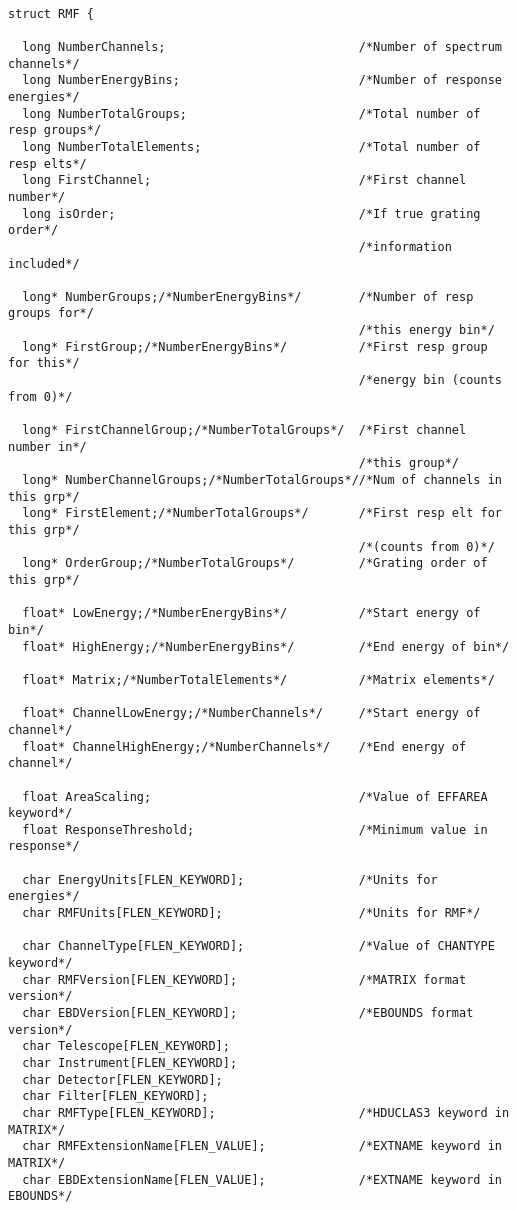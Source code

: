 \documentclass[11pt]{book}
\begin{document}
\begin{verbatim}

struct RMF {

  long NumberChannels;                           /*Number of spectrum channels*/
  long NumberEnergyBins;                         /*Number of response energies*/
  long NumberTotalGroups;                        /*Total number of resp groups*/
  long NumberTotalElements;                      /*Total number of resp elts*/
  long FirstChannel;                             /*First channel number*/
  long isOrder;                                  /*If true grating order*/
                                                 /*information included*/

  long* NumberGroups;/*NumberEnergyBins*/        /*Number of resp groups for*/
                                                 /*this energy bin*/
  long* FirstGroup;/*NumberEnergyBins*/          /*First resp group for this*/
                                                 /*energy bin (counts from 0)*/

  long* FirstChannelGroup;/*NumberTotalGroups*/  /*First channel number in*/
                                                 /*this group*/
  long* NumberChannelGroups;/*NumberTotalGroups*//*Num of channels in this grp*/
  long* FirstElement;/*NumberTotalGroups*/       /*First resp elt for this grp*/
                                                 /*(counts from 0)*/
  long* OrderGroup;/*NumberTotalGroups*/         /*Grating order of this grp*/

  float* LowEnergy;/*NumberEnergyBins*/          /*Start energy of bin*/
  float* HighEnergy;/*NumberEnergyBins*/         /*End energy of bin*/

  float* Matrix;/*NumberTotalElements*/          /*Matrix elements*/

  float* ChannelLowEnergy;/*NumberChannels*/     /*Start energy of channel*/
  float* ChannelHighEnergy;/*NumberChannels*/    /*End energy of channel*/

  float AreaScaling;                             /*Value of EFFAREA keyword*/
  float ResponseThreshold;                       /*Minimum value in response*/

  char EnergyUnits[FLEN_KEYWORD];                /*Units for energies*/
  char RMFUnits[FLEN_KEYWORD];                   /*Units for RMF*/

  char ChannelType[FLEN_KEYWORD];                /*Value of CHANTYPE keyword*/
  char RMFVersion[FLEN_KEYWORD];                 /*MATRIX format version*/
  char EBDVersion[FLEN_KEYWORD];                 /*EBOUNDS format version*/
  char Telescope[FLEN_KEYWORD];                             
  char Instrument[FLEN_KEYWORD];
  char Detector[FLEN_KEYWORD];
  char Filter[FLEN_KEYWORD];
  char RMFType[FLEN_KEYWORD];                    /*HDUCLAS3 keyword in MATRIX*/
  char RMFExtensionName[FLEN_VALUE];             /*EXTNAME keyword in MATRIX*/
  char EBDExtensionName[FLEN_VALUE];             /*EXTNAME keyword in EBOUNDS*/


\end{verbatim}
\end{document}
